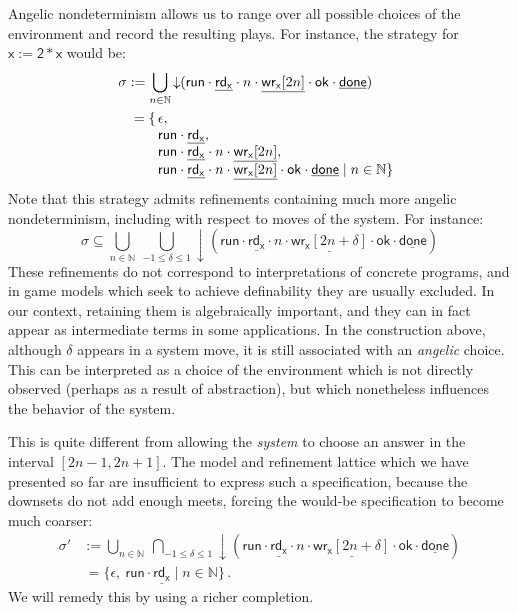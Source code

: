 \documentclass[draft,11pt]{report}
\newcommand{\kw}[1]{\ensuremath{ \mathsf{#1} }}
\begin{document}
Angelic nondeterminism
allows us to range over all possible choices of the environment
and record the resulting plays.
For instance,
the strategy for $\kw{x := 2 * x}$
would be:
\begin{align*}
  \sigma &:=
    \bigcup_{n \in \mathbb{N}} {\downarrow}(
      \kw{run} \cdot
      \underline{\kw{rd}_\kw{x}} \cdot n \cdot
      \underline{\kw{wr}_\kw{x}[2n]} \cdot \kw{ok} \cdot
      \underline{\kw{done}}) \\
  &
      \begin{array}{l@{\,}l}
        = \{ & \epsilon, \\ &
        \kw{run} \cdot
        \underline{\kw{rd}_\kw{x}} ,
        \\ &
        \kw{run} \cdot
        \underline{\kw{rd}_\kw{x}} \cdot n \cdot
        \underline{\kw{wr}_\kw{x}[2n]} ,
        \\ &
        \kw{run} \cdot
        \underline{\kw{rd}_\kw{x}} \cdot n \cdot
        \underline{\kw{wr}_\kw{x}[2n]} \cdot \kw{ok} \cdot
        \underline{\kw{done}}
        \mid n \in \mathbb{N} \}
      \end{array}
\end{align*}
Note that this strategy admits refinements
containing much more angelic nondeterminism,
including with respect to moves of the system.
For instance:
\[
  \sigma \subseteq
    \bigcup_{n \in \mathbb{N}} \:
    \bigcup_{-1 \le \delta \le 1}
    {\downarrow}(
      \kw{run} \cdot
      \underline{\kw{rd}_\kw{x}} \cdot n \cdot
      \underline{\kw{wr}_\kw{x}[2n + \delta]} \cdot \kw{ok} \cdot
      \underline{\kw{done}})
\]
These refinements do not correspond to interpretations
of concrete programs,
and in game models which seek to achieve definability
they are usually excluded.
In our context, retaining them is algebraically important,
and they can in fact appear as intermediate terms
in some applications.
In the construction above,
although $\delta$ appears in a system move,
it is still associated with an \emph{angelic} choice.
This can be interpreted as a choice of the environment
which is not directly observed
(perhaps as a result of abstraction),
but which nonetheless influences the behavior of the system.

This is quite different from allowing the \emph{system}
to choose an answer in the interval $[2n - 1, 2n + 1]$.
The model and refinement lattice which
we have presented so far are insufficient
to express such a specification,
because the downsets do not add enough meets,
forcing the would-be specification to become
much coarser:
\begin{align*}
  \sigma' &:=
    \bigcup_{n \in \mathbb{N}} \:
    \bigcap_{-1 \le \delta \le 1}
    {\downarrow}(
      \kw{run} \cdot
      \underline{\kw{rd}_\kw{x}} \cdot n \cdot
      \underline{\kw{wr}_\kw{x}[2n + \delta]} \cdot \kw{ok} \cdot
      \underline{\kw{done}}) \\
  & \, =
    \{ \epsilon,  \:
       \kw{run} \cdot \underline{\kw{rd}_\kw{x}}
       \mid n \in \mathbb{N} \} \,.
\end{align*}
We will remedy this by using a richer completion.
\end{document}
